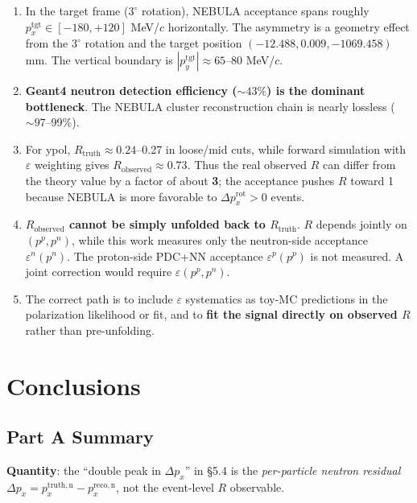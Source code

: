 \documentclass[a4paper,11pt]{article}
\begin{document}
\begin{enumerate}
    \item In the target frame ($3^\circ$ rotation), NEBULA acceptance spans
          roughly $p_x^\mathrm{tgt}\in[-180,+120]$ MeV/$c$ horizontally. The
          asymmetry is a geometry effect from the $3^\circ$ rotation and the
          target position $(-12.488,0.009,-1069.458)$ mm. The vertical boundary
          is $|p_y^\mathrm{tgt}|\approx 65$--80 MeV/$c$.
    \item \textbf{Geant4 neutron detection efficiency ($\sim 43\%$) is the
          dominant bottleneck}. The NEBULA cluster reconstruction chain is
          nearly lossless ($\sim 97$--99\%).
    \item For ypol, $R_\mathrm{truth}\approx 0.24$--0.27 in loose/mid cuts, while
          forward simulation with $\varepsilon$ weighting gives
          $R_\mathrm{observed}\approx 0.73$. Thus the real observed $R$ can
          differ from the theory value by a factor of about \textbf{3}; the
          acceptance pushes $R$ toward 1 because NEBULA is more favorable to
          $\Delta p_x^\mathrm{rot}>0$ events.
    \item \textbf{$R_\mathrm{observed}$ cannot be simply unfolded back to
          $R_\mathrm{truth}$}. $R$ depends jointly on $(p^p,p^n)$, while this
          work measures only the neutron-side acceptance $\varepsilon^n(p^n)$.
          The proton-side PDC+NN acceptance $\varepsilon^p(p^p)$ is not measured.
          A joint correction would require $\varepsilon(p^p,p^n)$.
    \item The correct path is to include $\varepsilon$ systematics as toy-MC
          predictions in the polarization likelihood or fit, and to
          \textbf{fit the signal directly on observed $R$} rather than
          pre-unfolding.
\end{enumerate}

\section{Conclusions}

\subsection{Part A Summary}

\textbf{Quantity}: the ``double peak in $\Delta p_x$'' in \S5.4 is the
\emph{per-particle neutron residual}
$\Delta p_x=p_x^{\mathrm{truth,n}}-p_x^{\mathrm{reco,n}}$, not the event-level
$R$ observable.
\end{document}
